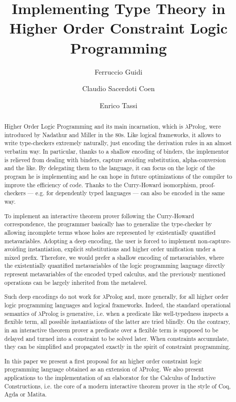\documentclass{easychair}
\title{Implementing Type Theory in Higher Order Constraint Logic Programming}
\author{Ferruccio Guidi \and Claudio Sacerdoti Coen \and Enrico Tassi}
\institute{
  Department of Computer Science and Engineering, University of Bologna \email{ferruccio.guidi@unibo.it} \and
  Department of Computer Scienc and Engineeringe, University of Bologna \email{claudio.sacerdoticoen@unibo.it} \and
  Inria Sophia-Antipolis, \email{Enrico.Tassi@inria.fr}}
\begin{document}
\maketitle

\begin{abstract}
Higher Order Logic Programming and its main incarnation, which is $\lambda$Prolog, were introduced by Nadathur and Miller in the 80s. Like logical frameworks, it allows to write type-checkers extremely naturally, just encoding the derivation rules in an almost verbatim way. In particular, thanks to a shallow encoding of binders, the implementor is relieved from dealing with binders, capture avoiding substitution, alpha-conversion and the like. By delegating them to the language, it can focus on the logic of the program he is implementing and he can hope in future optimizations of the compiler to improve the efficiency of code. Thanks to the Curry-Howard isomorphism, proof-checkers --- e.g. for dependently typed languages --- can also be encoded in the same way.

To implement an interactive theorem prover following the Curry-Howard correspondence, the programmer basically has to generalize the type-checker by allowing incomplete terms whose holes are represented by existentially quantified metavariables. Adopting a deep encoding, the user is forced to implement non-capture-avoiding instantiation, explicit substitutions and higher order unification under a mixed prefix. Therefore, we would prefer a shallow encoding of metavariables, where the existentially quantified metavariables of the logic programming language directly represent metavariables of the encoded typed calculus, and the previously mentioned operations can be largely inherited from the metalevel.

Such deep encodings do not work for $\lambda$Prolog and, more generally, for all higher order logic programming languages and logical frameworks. Indeed, the standard operational semantics of $\lambda$Prolog is generative, i.e. when a predicate like well-typedness inspects a flexible term, all possible instantiations of the latter are tried blindly. On the contrary, in an interactive theorem prover a predicate over a flexible term is supposed to be delayed and turned into a constraint to be solved later. When constraints accumulate, they can be simplified and propagated exactly in the spirit of constraint programming.

In this paper we present a first proposal for an higher order constraint logic
programming language obtained as an extension of $\lambda$Prolog. We also present
applications to the implementation of an elaborator for the Calculus of
Inductive Constructions, i.e. the core of a modern interactive theorem prover
in the style of Coq, Agda or Matita.
\end{abstract}
\end{document}
